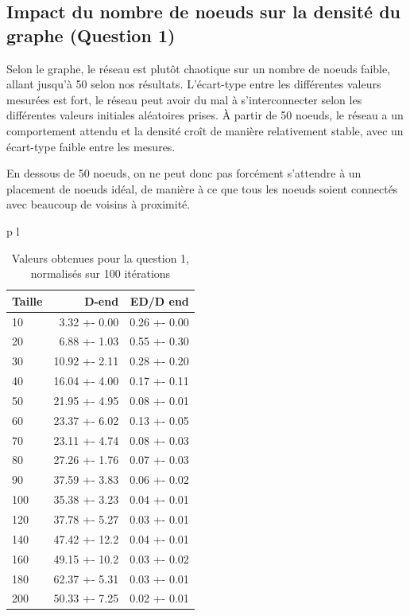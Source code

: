 \documentclass[a4paper]{article}
\begin{document}
\subsection{Impact du nombre de noeuds sur la densité du
  graphe (Question 1)}
\begin{minipage}{0.5\textwidth}
  Selon le graphe, le réseau est plutôt chaotique sur un nombre de
  noeuds faible, allant jusqu'à 50 selon nos résultats. L'écart-type
  entre les différentes valeurs mesurées est fort, le réseau peut
  avoir du mal à s'interconnecter selon les différentes valeurs
  initiales aléatoires prises. À partir de 50 noeuds, le réseau a un
  comportement attendu et la densité croît de manière relativement
  stable, avec un écart-type faible entre les mesures.

  En dessous de 50 noeuds, on ne peut donc pas forcément s'attendre à
  un placement de noeuds idéal, de manière à ce que tous les noeuds
  soient connectés avec beaucoup de voisins à proximité.
  \vfill
\end{minipage}%
\hfill
\begin{minipage}{0.5\textwidth}
\begin{tabular}{p{\textwidth} l}
\begin{table}[H]
  \centering
  \begin{tabular}{|l|r|r|}
    \hline
    Taille & D-end & ED/D end \\ \hline
    10  &  3.32 +- 0.00 & 0.26 +- 0.00 \\ \hline
     20  &  6.88 +- 1.03 & 0.55 +- 0.30 \\ \hline
     30  & 10.92 +- 2.11 & 0.28 +- 0.20 \\ \hline
     40  & 16.04 +- 4.00 & 0.17 +- 0.11 \\ \hline
     50  & 21.95 +- 4.95 & 0.08 +- 0.01 \\ \hline
     60  & 23.37 +- 6.02 & 0.13 +- 0.05 \\ \hline
     70  & 23.11 +- 4.74 & 0.08 +- 0.03 \\ \hline
     80  & 27.26 +- 1.76 & 0.07 +- 0.03 \\ \hline
     90  & 37.59 +- 3.83 & 0.06 +- 0.02 \\ \hline
     100 & 35.38 +- 3.23 & 0.04 +- 0.01 \\ \hline
     120 & 37.78 +- 5.27 & 0.03 +- 0.01 \\ \hline
     140 & 47.42 +- 12.2 & 0.04 +- 0.01 \\ \hline
     160 & 49.15 +- 10.2 & 0.03 +- 0.02 \\ \hline
     180 & 62.37 +- 5.31 & 0.03 +- 0.01 \\ \hline
     200 & 50.33 +- 7.25 & 0.02 +- 0.01 \\ \hline
  \end{tabular}
  \caption{Valeurs obtenues pour la question 1, normalisés sur 100 itérations}
\end{table}
\end{tabular}
\end{minipage}
\end{document}
